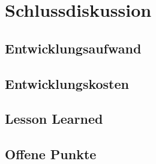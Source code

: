 \section{Schlussdiskussion}

\subsection{Entwicklungsaufwand}

\subsection{Entwicklungskosten}

\subsection{Lesson Learned}

\subsection{Offene Punkte}

\newpage